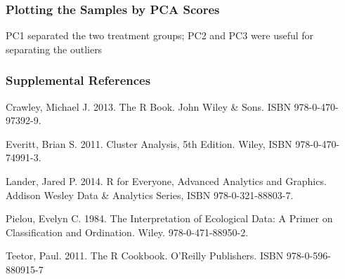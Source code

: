 \documentclass[10pt]{beamer}
\begin{document}
\begin{frame}[fragile]
\frametitle{Plotting the Samples by PCA Scores}

\begin{center}

{\scriptsize 
PC1 separated the two treatment groups; PC2 and PC3 were useful for separating
  the outliers\\
}
\end{center}

\end{frame}



\begin{frame}
\frametitle{Supplemental References}

\bi
\item Crawley, Michael J.  2013.  The R Book.  John Wiley \&
  Sons. ISBN 978-0-470-97392-9.

\item Everitt, Brian S.  2011.  Cluster Analysis, 5th Edition.
Wiley, ISBN 978-0-470-74991-3.
 
\item Lander, Jared P.  2014.  R for Everyone, Advanced Analytics and
  Graphics.  Addison Wesley Data \& Analytics Series, ISBN
  978-0-321-88803-7.

\item Pielou, Evelyn C.  1984.  The Interpretation of Ecological Data:
  A Primer on Classification and Ordination. Wiley.
  978-0-471-88950-2.

\item Teetor, Paul. 2011.  The R Cookbook.  O'Reilly Publishers. ISBN
  978-0-596-880915-7 
\ei
\end{frame}
\end{document}
